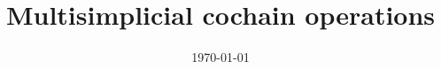\documentclass{amsart}
\title[Short title]{Multisimplicial cochain operations}
\date{\today}
\begin{document}
%	
%	
%	
%	
	
	
%	
	\todos
%	
\end{document}
